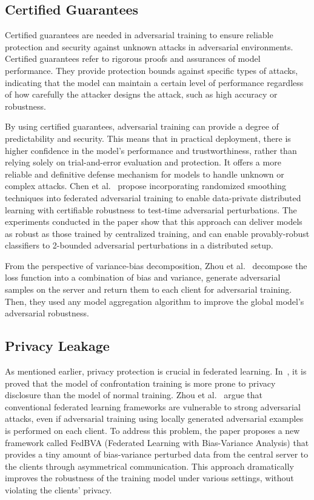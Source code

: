 \documentclass[pdflatex,sn-mathphys-num]{sn-jnl}%
\theoremstyle{thmstyleone}%
\theoremstyle{thmstyletwo}%
\theoremstyle{thmstylethree}%
\begin{document}
\subsection{Certified Guarantees}
Certified guarantees are needed in adversarial training
to ensure reliable protection and security against unknown
attacks in adversarial environments. Certified guarantees
refer to rigorous proofs and assurances of model
performance. They provide protection bounds against specific
types of attacks, indicating that the model can maintain
a certain level of performance regardless of how carefully
the attacker designs the attack, such as high accuracy or
robustness.

By using certified guarantees, adversarial training can
provide a degree of predictability and security. This means
that in practical deployment, there is higher confidence in
the model's performance and trustworthiness, rather than
relying solely on trial-and-error evaluation and protection.
It offers a more reliable and definitive defense mechanism
for models to handle unknown or complex attacks.
Chen et al.~\cite{chen2021certifiably} propose incorporating randomized
smoothing techniques into federated adversarial training
to enable data-private distributed learning with
certifiable robustness to test-time adversarial perturbations.
The experiments conducted in the paper show that this
approach can deliver models as robust as those trained
by centralized training, and can enable provably-robust
classifiers to 2-bounded adversarial perturbations in a
distributed setup.

From the perspective of variance-bias decomposition,
Zhou et al.~\cite{zhou2022adversarial} decompose the loss function into a
combination of bias and variance, generate adversarial
samples on the server and return them to each client for
adversarial training. Then, they used any model
aggregation algorithm to improve the global model's adversarial robustness.

\subsection{Privacy Leakage}
As mentioned earlier, privacy protection is crucial in
federated learning. In~\cite{zhang2022privacy}, it is proved that the model of
confrontation training is more prone to privacy disclosure
than the model of normal training. Zhou et al.~\cite{zhou2020adversarially}
argue that conventional federated learning frameworks are
vulnerable to strong adversarial attacks, even if adversarial
training using locally generated adversarial examples is
performed on each client. To address this problem, the
paper proposes a new framework called FedBVA (Federated
Learning with Bias-Variance Analysis) that provides a tiny
amount of bias-variance perturbed data from the central
server to the clients through asymmetrical communication.
This approach dramatically improves the robustness of the
training model under various settings, without violating
the clients' privacy.
\end{document}
